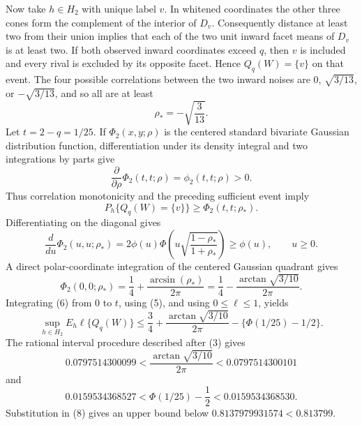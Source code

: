 Now take \(h\in H_2\) with unique label \(v\).  In whitened coordinates the
other three cones form the complement of the interior of \(D_v\).
Consequently distance at least two from their union implies that each of
the two unit inward facet means of \(D_v\) is at least two.  If both observed
inward coordinates exceed \(q\), then \(v\) is included and every rival is
excluded by its opposite facet.  Hence \(Q_q(W)=\{v\}\) on that event.
The four possible correlations between the two inward noises are \(0\),
\(\sqrt{3/13}\), or \(-\sqrt{3/13}\), and so all are at least
\[
 \rho_*=-\sqrt{\frac3{13}}.
\tag{4}
\]
Let \(t=2-q=1/25\).  If \(\Phi_2(x,y;\rho)\) is the centered standard
bivariate Gaussian distribution function, differentiation under its
density integral and two integrations by parts give
\[
 \frac{\partial}{\partial\rho}\Phi_2(t,t;\rho)
 =\phi_2(t,t;\rho)>0.
\]
Thus correlation monotonicity and the preceding sufficient event imply
\[
 P_h\{Q_q(W)=\{v\}\}\geq\Phi_2(t,t;\rho_*).
\tag{5}
\]
Differentiating on the diagonal gives
\[
 \frac d{du}\Phi_2(u,u;\rho_*)
 =2\phi(u)\Phi\left(
 u\sqrt{\frac{1-\rho_*}{1+\rho_*}}\right)
 \geq\phi(u),\qquad u\geq0.
\tag{6}
\]
A direct polar-coordinate integration of the centered Gaussian quadrant
gives
\[
 \Phi_2(0,0;\rho_*)
 =\frac14+\frac{\arcsin(\rho_*)}{2\pi}
 =\frac14-\frac{\arctan\sqrt{3/10}}{2\pi}.
\tag{7}
\]
Integrating (6) from \(0\) to \(t\), using (5), and using
\(0\leq\ell\leq1\), yields
\[
 \sup_{h\in H_2}E_h\ell\{Q_q(W)\}
 \leq
 \frac34+\frac{\arctan\sqrt{3/10}}{2\pi}
 -\{\Phi(1/25)-1/2\}.
\tag{8}
\]
The rational interval procedure described after (3) gives
\[
 0.0797514300099
 <\frac{\arctan\sqrt{3/10}}{2\pi}
 <0.0797514300101
\tag{9}
\]
and
\[
 0.0159534368527
 <\Phi(1/25)-\frac12
 <0.0159534368530.
\tag{10}
\]
Substitution in (8) gives an upper bound below
\(0.8137979931574<0.813799\).

